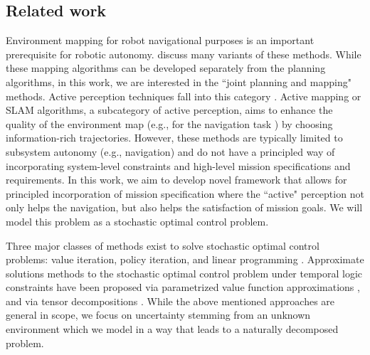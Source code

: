 \documentclass[conference]{IEEEtran}
\renewcommand{\cite}[1]{\citep{#1}}
\begin{document}
\subsection{Related work}
Environment mapping for robot navigational purposes is an important prerequisite for robotic autonomy. \cite{Thrun2005,stachniss2009_book,thrun2002robotic} discuss many variants of these methods. While these mapping algorithms can be developed separately from the planning algorithms, in this work, we are interested in the ``joint planning and mapping" methods. Active perception techniques fall into this category \cite{blake1992active, aloimonos1988active,soatto2013actionable}. 
Active mapping or SLAM algorithms, a subcategory of active perception, aims to enhance the quality of the environment map (e.g., for the navigation task \cite{Agha2017ISRR,feder1999adaptive,davison2002simultaneous,Mu16-CDC}) by choosing information-rich trajectories. However, these methods are typically limited to subsystem autonomy (e.g., navigation) and do not have a principled way of incorporating system-level constraints and high-level mission specifications and requirements. In this work, we aim to develop novel framework that allows for principled incorporation of mission specification where the ``active" perception not only helps the navigation, but also helps the satisfaction of mission goals. We will model this problem as a stochastic optimal control problem.

Three major classes of methods exist to solve stochastic optimal control problems: value iteration, policy iteration, and linear programming \cite{Bertsekas1978}. Approximate solutions methods to the stochastic optimal control problem under temporal logic constraints have been proposed via parametrized value function approximations \cite{Papusha2016,Leong2016}, and via tensor decompositions \cite{Alora2016}. While the above mentioned approaches are general in scope, we focus on uncertainty stemming from an unknown environment which we model in a way that leads to a naturally decomposed problem. 

\end{document}

